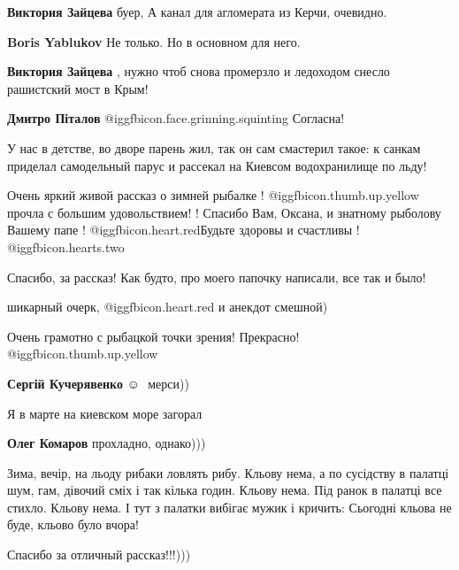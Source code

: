 \begin{itemize}
\begin{itemize} %
\textbf{Виктория Зайцева} буер, А канал для агломерата из Керчи, очевидно.

\textbf{Boris Yablukov} Не только. Но в основном для него.

\textbf{Виктория Зайцева} , нужно чтоб снова промерзло и ледоходом снесло рашистский мост в Крым!

\textbf{Дмитро Піталов}  @igg{fbicon.face.grinning.squinting} Согласна!
\end{itemize} %


У нас в детстве, во дворе парень жил, так он сам смастерил такое: к санкам
приделал самодельный парус и рассекал на Киевсом водохранилище по льду!


Очень яркий живой рассказ о зимней рыбалке !  @igg{fbicon.thumb.up.yellow} прочла с большим удовольствием!
! Спасибо Вам, Оксана, и знатному рыболову Вашему папе ! @igg{fbicon.heart.red}Будьте здоровы и
счастливы ! @igg{fbicon.hearts.two} 


Спасибо, за рассказ! Как будто, про моего папочку написали, все так и было!

шикарный очерк, @igg{fbicon.heart.red}
и анекдот смешной)

Очень грамотно с рыбацкой точки зрения! Прекрасно! @igg{fbicon.thumb.up.yellow} 

\textbf{Сергій Кучерявенко}  ☺ ️ мерси))

Я в марте на киевском море загорал

\textbf{Олег Комаров} прохладно, однако)))


Зима, вечір, на льоду рибаки ловлять рибу. Кльову нема, а по сусідству в
палатці шум, гам, дівочий сміх і так кілька годин. Кльову нема. Під ранок в
палатці все стихло. Кльову нема. І тут з палатки вибігає мужик і кричить:
Сьогодні кльова не буде, кльово було вчора!

Спасибо за отличный рассказ!!!)))



\end{itemize}
